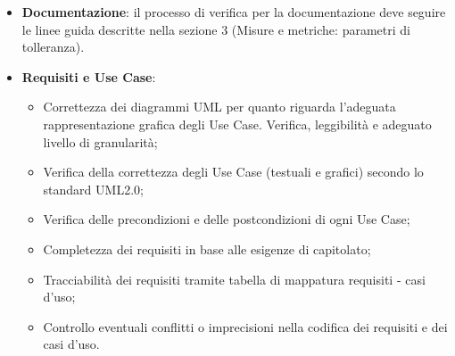 \documentclass[a4paper,11pt]{article}
\begin{document}
\begin{itemize}
\item \textbf{Documentazione}: il processo di verifica per la documentazione deve seguire le linee guida descritte nella sezione 3 (Misure e metriche: parametri di tolleranza).
\item \textbf{Requisiti e Use Case}: 
\begin{itemize}
\item Correttezza dei diagrammi UML per quanto riguarda l'adeguata rappresentazione grafica degli Use Case. Verifica, leggibilità e adeguato livello di granularità;
\item Verifica della correttezza degli Use Case (testuali e grafici) secondo lo standard UML2.0;
\item Verifica delle precondizioni e delle postcondizioni di ogni Use Case;
\item Completezza dei requisiti in base alle esigenze di capitolato;
\item Tracciabilità dei requisiti tramite tabella di mappatura requisiti - casi d'uso;
\item Controllo eventuali conflitti o imprecisioni nella codifica dei requisiti e dei casi d'uso.
\end{itemize}
 

\end{itemize}
\end{document}
